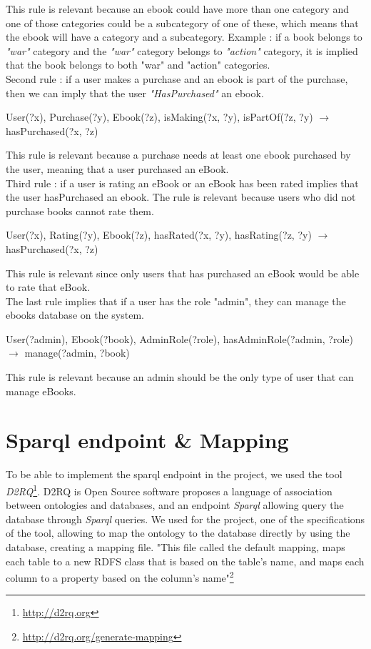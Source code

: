 \documentclass[a4paper,12pt]{article}
\begin{document}
This rule is relevant because an ebook could have more than one category and one of those categories could
be a subcategory of one of these, which means that the ebook will have a category and a subcategory.
Example : if a book belongs to \textit{"war"} category and the \textit{"war"} category belongs to \textit{"action"} category,
it is implied that the book belongs to both "war" and "action" categories.\\

Second rule : if a user makes a purchase and an ebook is part of the purchase, then we can imply that
the user \textit{"HasPurchased"} an ebook. 

User(?x), Purchase(?y), Ebook(?z), isMaking(?x, ?y), isPartOf(?z, ?y) $\rightarrow$ hasPurchased(?x, ?z)

This rule is relevant because a purchase needs at least one ebook purchased by the user, meaning
that a user purchased an eBook.\\

Third rule : if a user is rating an eBook or an eBook has been rated implies that the user hasPurchased an ebook.
The rule is relevant because users who did not purchase books cannot rate them.

User(?x), Rating(?y), Ebook(?z), hasRated(?x, ?y), hasRating(?z, ?y) $\rightarrow$ hasPurchased(?x, ?z)

This rule is relevant since only users that has purchased an eBook would be able to rate that eBook.\\

The last rule implies that if a user has the role "admin", they can manage the ebooks database on the system.

User(?admin), Ebook(?book), AdminRole(?role), hasAdminRole(?admin, ?role) $\rightarrow$ manage(?admin, ?book)

This rule is relevant because an admin should be the only type of user that can manage eBooks.

\section{Sparql endpoint \& Mapping}
To be able to implement the sparql endpoint in the project, we used the tool \textit{D2RQ}\footnote{\url{http://d2rq.org}}. D2RQ is Open Source software proposes a language of association between ontologies and databases, and an endpoint \textit{Sparql} allowing query the database through \textit{Sparql} queries. We used for the project, one of the specifications of the tool, allowing to map the ontology to the database directly by using the database, creating a mapping file. "This file called the default mapping, maps each table to a new RDFS class that is based on the table's name, and maps each column to a property based on the column's name"\footnote{\url{http://d2rq.org/generate-mapping}}
\end{document}
